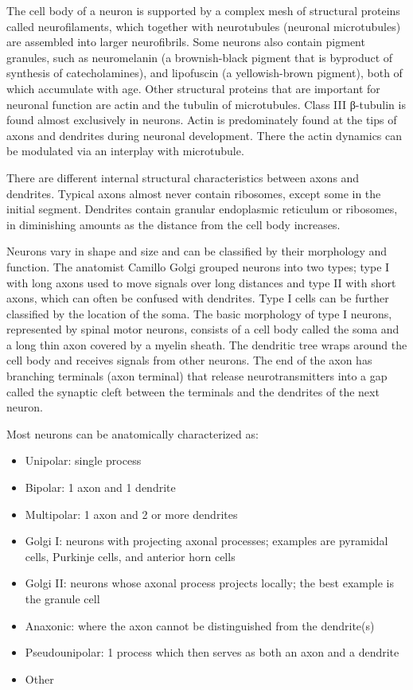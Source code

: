 The cell body of a neuron is supported by a complex mesh of structural proteins called neurofilaments, which together with neurotubules (neuronal microtubules) are assembled into larger neurofibrils. Some neurons also contain pigment granules, such as neuromelanin (a brownish-black pigment that is byproduct of synthesis of catecholamines), and lipofuscin (a yellowish-brown pigment), both of which accumulate with age. Other structural proteins that are important for neuronal function are actin and the tubulin of microtubules. Class III β-tubulin is found almost exclusively in neurons. Actin is predominately found at the tips of axons and dendrites during neuronal development. There the actin dynamics can be modulated via an interplay with microtubule.

There are different internal structural characteristics between axons and dendrites. Typical axons almost never contain ribosomes, except some in the initial segment. Dendrites contain granular endoplasmic reticulum or ribosomes, in diminishing amounts as the distance from the cell body increases.

Neurons vary in shape and size and can be classified by their morphology and function. The anatomist Camillo Golgi grouped neurons into two types; type I with long axons used to move signals over long distances and type II with short axons, which can often be confused with dendrites. Type I cells can be further classified by the location of the soma. The basic morphology of type I neurons, represented by spinal motor neurons, consists of a cell body called the soma and a long thin axon covered by a myelin sheath. The dendritic tree wraps around the cell body and receives signals from other neurons. The end of the axon has branching terminals (axon terminal) that release neurotransmitters into a gap called the synaptic cleft between the terminals and the dendrites of the next neuron.

Most neurons can be anatomically characterized as:

\begin{itemize}
\tightlist
\item
  Unipolar: single process
\item
  Bipolar: 1 axon and 1 dendrite
\item
  Multipolar: 1 axon and 2 or more dendrites
\item
  Golgi I: neurons with projecting axonal processes; examples are pyramidal cells, Purkinje cells, and anterior horn cells
\item
  Golgi II: neurons whose axonal process projects locally; the best example is the granule cell
\item
  Anaxonic: where the axon cannot be distinguished from the dendrite(s)
\item
  Pseudounipolar: 1 process which then serves as both an axon and a dendrite
\item
  Other
\end{itemize}

